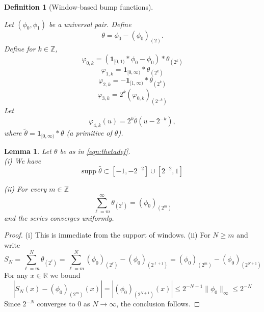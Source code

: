 \documentclass[12pt,reqno]{amsart}
\theoremstyle{plain}
\newtheorem{lemma}[theorem]{Lemma}
\newtheorem{definition}[theorem]{Definition}
\numberwithin{equation}{section}
\theoremstyle{remark}
\newcommand{\uses}[1]{}
\newcommand{\usesdefs}[1]{}
\newcommand{\leanok}{}
\newcommand{\lean}[1]{}
\newcommand{\R}{{\mathbb R}}
\begin{document}
\begin{definition}[Window-based bump functions]\label{defn:window based bump functions}\uses{lem:cpair}\usesdefs{def:unipair}
\lean{Auto.windowBasedBumpFunctions}
Let $(\phi_0,\phi_1)$ be a universal pair.
Define
\begin{equation}\label{eqn:thetadef}
{\theta}={\phi_0}-{(\phi_0)}_{(2)}.
\end{equation}
Define for $k\in\mathbb{Z}$,
\begin{equation}\label{eqn:varphi0kdef}
\varphi_{0,k} = (\mathbf{1}_{[0,1)}\ast\phi_0 - \phi_0)\ast \theta_{(2^{k})}
\end{equation}
\begin{equation}\label{eqn:varphi1kdef}\varphi_{1,k} = \mathbf{1}_{[0,\infty)}\ast\theta_{(2^k)}
\end{equation}
\begin{equation}\label{eqn:varphi2kdef}\varphi_{2,k} = -\mathbf{1}_{[1,\infty)}\ast\theta_{(2^k)}
\end{equation}
\begin{equation}\label{eqn:varphi3def}
\varphi_{3,k} = 2^{k}(\varphi_{0,k})_{(2^{-k})}
\end{equation}
Let
\begin{equation}\label{eqn:varphi4kdef}
\varphi_{4,k}(u)=2^k\widetilde{\theta}(u-2^{-k}),
\end{equation}
where $\widetilde{\theta}=\mathbf{1}_{[0,\infty)}*\theta$ (a primitive of $\theta$).
\end{definition}

\begin{lemma}\label{lem:bumpbasic}\lean{Auto.bumpBasic}\leanok\uses{}\usesdefs{def:cn-window,def:unipair,defn:window based bump functions}
Let $\theta$ be as in \eqref{eqn:thetadef}.\\

(i) We have
\begin{equation}\label{auto:theta-Fourier-support} \mathrm{supp}\;\widehat{\theta} \subset [-1,-2^{-2}]\cup [2^{-2},1] \end{equation}

(ii) For every $m\in\mathbb{Z}$
\begin{equation}\label{auto:theta-telescoping-sum} \sum_{\ell=m}^\infty \theta_{(2^\ell)} = (\phi_0)_{(2^m)} \end{equation}
and the series converges uniformly.
\end{lemma}

\begin{proof}
(i) This is immediate from the support of windows.
(ii) For  $N\ge m$ and write
\[ S_N = \sum_{\ell=m}^N \theta_{(2^\ell)} =  \sum_{\ell=m}^N (\phi_0)_{(2^\ell)} - (\phi_0)_{(2^{\ell+1})} = (\phi_0)_{(2^m)} - (\phi_0)_{(2^{N+1})} \]
For any $x\in \R$ we  bound
\[|S_N(x)-(\phi_0)_{(2^m)}(x)| = |(\phi_0)_{(2^{N+1})}(x)|  \le 2^{-N-1}\|\phi_0\|_\infty \le 2^{-N} \]
Since $2^{-N}$ converges   to $0$ as $N\to \infty$, the conclusion follows.
\end{proof}
\end{document}
